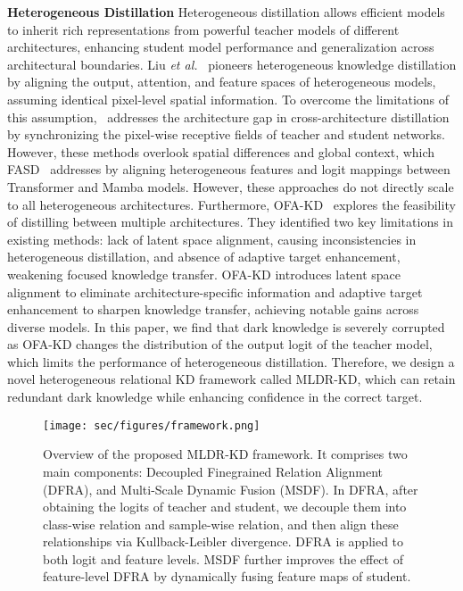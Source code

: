 \textbf{Heterogeneous Distillation}
Heterogeneous distillation allows efficient models to inherit rich representations from powerful teacher models of different architectures, enhancing student model performance and generalization across architectural boundaries. Liu \textit{et al.}~\cite{liu2022cross} pioneers heterogeneous knowledge distillation by aligning the output, attention, and feature spaces of heterogeneous models, assuming identical pixel-level spatial information. To overcome the limitations of this assumption,~\cite{zhao2023cross} addresses the architecture gap in cross-architecture distillation by synchronizing the pixel-wise receptive fields of teacher and student networks. However, these methods overlook spatial differences and global context, which FASD~\cite{yu2024unleashing} addresses by aligning heterogeneous features and logit mappings between Transformer and Mamba models. However, these approaches do not directly scale to all heterogeneous architectures.
Furthermore, OFA-KD~\cite{hao2024one} explores the feasibility of distilling between multiple architectures. They identified two key limitations in existing methods: lack of latent space alignment, causing inconsistencies in heterogeneous distillation, and absence of adaptive target enhancement, weakening focused knowledge transfer. OFA-KD introduces latent space alignment to eliminate architecture-specific information and adaptive target enhancement to sharpen knowledge transfer, achieving notable gains across diverse models.
In this paper, we find that dark knowledge is severely corrupted as OFA-KD changes the distribution of the output logit of the teacher model, which limits the performance of heterogeneous distillation. 
Therefore, we design a novel heterogeneous relational KD framework called MLDR-KD, which can retain redundant dark knowledge while enhancing confidence in the correct target.


\begin{figure*}[t]
  \centering
  \texttt{[image: sec/figures/framework.png]}
  \vspace{-3mm}
  \caption{Overview of the proposed MLDR-KD framework. It comprises two main components:  Decoupled Finegrained Relation Alignment (DFRA), and Multi-Scale Dynamic Fusion (MSDF). In DFRA, after obtaining the logits of teacher and student, we decouple them into class-wise relation and sample-wise relation, and then align these relationships via Kullback-Leibler divergence. DFRA is applied to both logit and feature levels. MSDF further improves the effect of feature-level DFRA by dynamically fusing feature maps of student.
  }
  \vspace{-5mm}
  \label{fig:framework}
\end{figure*}


